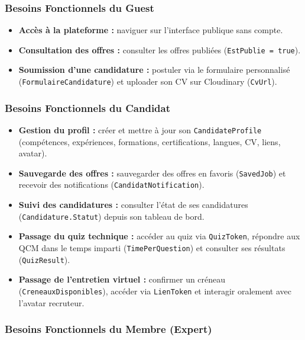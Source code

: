 \subsubsection{Besoins Fonctionnels du Guest}

\begin{itemize}
    \item \textbf{Accès à la plateforme :} naviguer sur l'interface publique sans compte.
    \item \textbf{Consultation des offres :} consulter les offres publiées (\texttt{EstPublie = true}).
    \item \textbf{Soumission d'une candidature :} postuler via le formulaire personnalisé
    (\texttt{FormulaireCandidature}) et uploader son CV sur Cloudinary (\texttt{CvUrl}).
\end{itemize}

\subsubsection{Besoins Fonctionnels du Candidat}

\begin{itemize}
    \item \textbf{Gestion du profil :} créer et mettre à jour son \texttt{CandidateProfile}
    (compétences, expériences, formations, certifications, langues, CV, liens, avatar).

    \item \textbf{Sauvegarde des offres :} sauvegarder des offres en favoris
    (\texttt{SavedJob}) et recevoir des notifications (\texttt{CandidatNotification}).

    \item \textbf{Suivi des candidatures :} consulter l'état de ses candidatures
    (\texttt{Candidature.Statut}) depuis son tableau de bord.

    \item \textbf{Passage du quiz technique :} accéder au quiz via \texttt{QuizToken},
    répondre aux QCM dans le temps imparti (\texttt{TimePerQuestion}) et consulter
    ses résultats (\texttt{QuizResult}).

    \item \textbf{Passage de l'entretien virtuel :} confirmer un créneau
    (\texttt{CreneauxDisponibles}), accéder via \texttt{LienToken} et interagir
    oralement avec l'avatar recruteur.
\end{itemize}

\subsubsection{Besoins Fonctionnels du Membre (Expert)}

